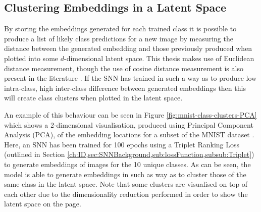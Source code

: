 \subsection{Clustering Embeddings in a Latent Space}\label{ch:ID,sec:deciding,sub:SNN,subsub:ClusteringEmbeddings}

By storing the embeddings generated for each trained class it is possible to produce a list of likely class predictions for a new image by measuring the distance between the generated embedding and those previously produced when plotted into some $d$-dimensional latent space. This thesis makes use of Euclidean distance measurement, though the use of cosine distance measurement is also present in the literature \cite{maharani_improving_2020, pan_towards_2020, feng_triplet_2020}. If the SNN has trained in such a way as to produce low intra-class, high inter-class difference between generated embeddings then this will create class clusters when plotted in the latent space. 

An example of this behaviour can be seen in Figure \ref{fig:mnist-class-clusters-PCA} which shows a 2-dimensional visualisation, produced using Principal Component Analysis (PCA), of the embedding locations for a subset of the MNIST dataset \cite{lecun_gradient-based_1998}. Here, an SNN has been trained for 100 epochs using a Triplet Ranking Loss (outlined in Section \ref{ch:ID,sec:SNNBackground,sub:lossFunction,subsub:Triplet}) to generate embeddings of images for the 10 unique classes. As can be seen, the model is able to generate embeddings in such as way as to cluster those of the same class in the latent space. Note that some clusters are visualised on top of each other due to the dimensionality reduction performed in order to show the latent space on the page. 

